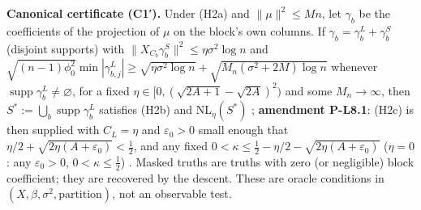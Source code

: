 \textbf{Canonical certificate (C1′).} Under (H2a) and $\|\mu\|^2\le Mn$, let $\gamma_b$ be the coefficients of the projection of $\mu$ on the block's own columns. If $\gamma_b=\gamma_b^L+\gamma_b^S$ (disjoint supports) with $\|X_{C_b}\gamma^S_b\|^2\le\eta\sigma^2\log n$ and $\sqrt{(n-1)\phi_0^2}\min|\gamma^L_{b,j}|\ge\sqrt{\eta\sigma^2\log n}+\sqrt{M_n(\sigma^2+2M)\log n}$ whenever $\operatorname{supp}\gamma^L_b\ne\varnothing$, for a fixed $\eta\in[0,(\sqrt{2A+1}-\sqrt{2A})^2)$ and some $M_n\to\infty$, then $S^*:=\bigcup_b\operatorname{supp}\gamma^L_b$ satisfies (H2b) and NL$_\eta(S^*)$ ; \textbf{amendment P-L8.1}: (H2c) is then supplied with $C_L=\eta$ and $\varepsilon_0>0$ small enough that $\eta/2+\sqrt{2\eta(A+\varepsilon_0)}<\frac12$, and any fixed $0<\kappa\le\frac12-\eta/2-\sqrt{2\eta(A+\varepsilon_0)}$ ($\eta=0$: any $\varepsilon_0>0$, $0<\kappa\le\frac12$) . Masked truths are truths with zero (or negligible) block coefficient; they are recovered by the descent. These are oracle conditions in $(X,\beta,\sigma^2,\text{partition})$, not an observable test.

